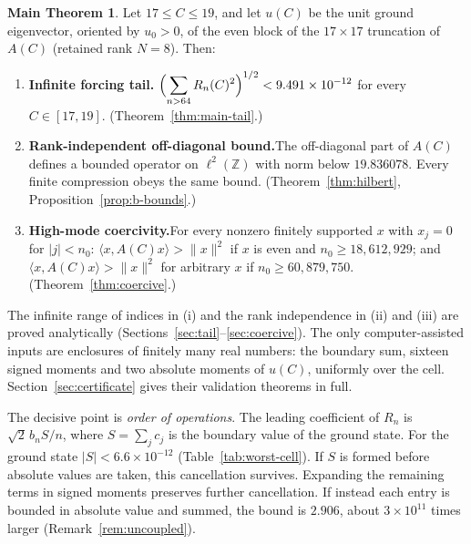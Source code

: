 \documentclass[11pt,a4paper]{article}
\theoremstyle{definition}
\newtheorem*{mainthm}{Main Theorem}
\newcommand{\Z}{\mathbb{Z}}
\newcommand{\ip}[2]{\langle #1,#2\rangle}
\newcommand{\norm}[1]{\lVert #1\rVert}
\newcommand{\abs}[1]{\lvert #1\rvert}
\begin{document}
\begin{mainthm}
Let $17\le C\le 19$, and let $u(C)$ be the unit ground eigenvector, oriented
by $u_0>0$, of the even block of the $17\times17$ truncation of $A(C)$
(retained rank $N=8$). Then:
\begin{enumerate}[label=\textup{(\roman*)}]
\item \textbf{Infinite forcing tail.}\quad
$\displaystyle\Bigl(\sum_{n>64}R_n(C)^2\Bigr)^{1/2}<9.491\times10^{-12}$
for every $C\in[17,19]$. (Theorem~\ref{thm:main-tail}.)
\item \textbf{Rank-independent off-diagonal bound.}\quad The off-diagonal
part of $A(C)$ defines a bounded operator on $\ell^2(\Z)$ with norm below
$19.836078$. Every finite compression obeys the same bound.
(Theorem~\ref{thm:hilbert}, Proposition~\ref{prop:b-bounds}.)
\item \textbf{High-mode coercivity.}\quad For every nonzero finitely supported
$x$ with $x_j=0$ for $\abs{j}<n_0$:
$\ip{x}{A(C)x}>\norm{x}^2$ if $x$ is even and $n_0\ge18{,}612{,}929$; and
$\ip{x}{A(C)x}>\norm{x}^2$ for arbitrary $x$ if $n_0\ge60{,}879{,}750$.
(Theorem~\ref{thm:coercive}.)
\end{enumerate}
\end{mainthm}

The infinite range of indices in (i) and the rank independence in (ii)
and (iii) are proved analytically (Sections~\ref{sec:tail}--\ref{sec:coercive}).
The only computer-assisted inputs are enclosures of finitely many real
numbers: the boundary sum, sixteen signed moments and two absolute moments
of $u(C)$, uniformly over the cell. Section~\ref{sec:certificate} gives
their validation theorems in full.

The decisive point is \emph{order of operations}. The leading coefficient
of $R_n$ is $\sqrt2\,b_n S/n$, where $S=\sum_j c_j$ is the boundary value of
the ground state. For the ground state $\abs{S}<6.6\times10^{-12}$
(Table~\ref{tab:worst-cell}). If $S$ is formed before absolute values are
taken, this cancellation survives. Expanding the remaining terms in signed
moments preserves further cancellation. If instead each entry is bounded in
absolute value and summed, the bound is $2.906$, about $3\times10^{11}$
times larger (Remark~\ref{rem:uncoupled}).
\end{document}
